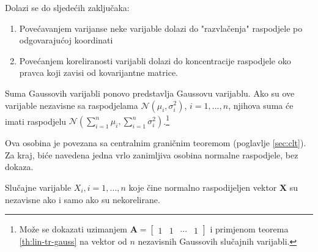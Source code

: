 \noindent
Dolazi se do sljedećih zaključaka:
\begin{enumerate}
	\item Povećavanjem varijanse neke varijable dolazi do "razvlačenja" raspodjele
		po odgovarajućoj koordinati
	\item Povećanjem koreliranosti varijabli dolazi do koncentracije raspodjele
		oko pravca koji zavisi od kovarijantne matrice.
\end{enumerate}

\begin{corollary}
  Suma Gaussovih varijabli ponovo predstavlja Gaussovu varijablu. Ako su ove
  varijable nezavisne sa raspodjelama $\mathcal{N}(\mu_i, \sigma_i^2)$,
  $i=1,...,n$, njihova suma će imati raspodjelu
  $\mathcal{N}(\sum_{i=1}^{n}\mu_i, \sum_{i=1}^{n}\sigma_i^2)$.\footnote{
    Može se dokazati uzimanjem $\bm A = \left[
        \begin{array}{cccc}
          1 & 1 & \cdots & 1
        \end{array}\right]$
    i primjenom teorema \ref{th:lin-tr-gauss} na vektor od $n$ nezavisnih
    Gaussovih slučajnih varijabli.
  }
\end{corollary}

Ova osobina je povezana sa centralnim graničnim teoremom (poglavlje
\ref{sec:clt}). Za kraj, biće navedena jedna vrlo zanimljiva osobina normalne
raspodjele, bez dokaza.

\begin{theorem}

  Slučajne varijable $X_i, i=1,...,n$ koje čine normalno raspodijeljen vektor
  $\bm X$ su nezavisne ako i samo ako su nekorelirane.

\end{theorem}

